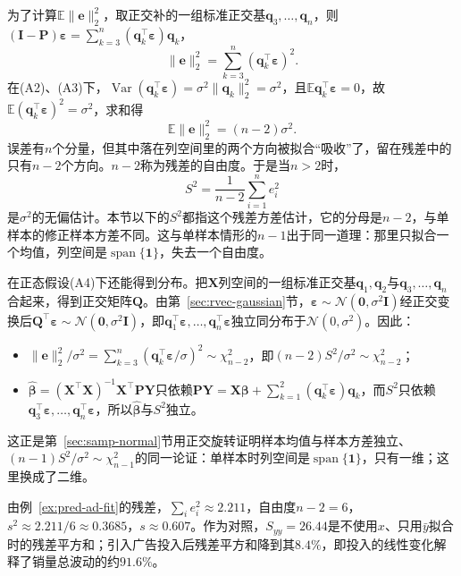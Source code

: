 为了计算$\mathbb E\lVert\bm e\rVert_2^2$，取正交补的一组标准正交基$\bm q_3,\dots,\bm q_n$，则$(\bm I-\bm P)\bm\varepsilon=\sum_{k=3}^n(\bm q_k^\top\bm\varepsilon)\bm q_k$，
\[
 \lVert\bm e\rVert_2^2=\sum_{k=3}^n(\bm q_k^\top\bm\varepsilon)^2.
\]
在(A2)、(A3)下，$\operatorname{Var}(\bm q_k^\top\bm\varepsilon)=\sigma^2\lVert\bm q_k\rVert_2^2=\sigma^2$，且$\mathbb E\bm q_k^\top\bm\varepsilon=0$，故$\mathbb E(\bm q_k^\top\bm\varepsilon)^2=\sigma^2$，求和得
\[
 \mathbb E\lVert\bm e\rVert_2^2=(n-2)\sigma^2.
\]
误差有$n$个分量，但其中落在列空间里的两个方向被拟合“吸收”了，留在残差中的只有$n-2$个方向。$n-2$称为残差的自由度。于是当$n>2$时，
\begin{equation}
 S^2=\frac{1}{n-2}\sum_{i=1}^ne_i^2
 \label{eq:pred-residual-variance}
\end{equation}
是$\sigma^2$的无偏估计。本节以下的$S^2$都指这个残差方差估计，它的分母是$n-2$，与单样本的修正样本方差不同。这与单样本情形的$n-1$出于同一道理：那里只拟合一个均值，列空间是$\operatorname{span}\{\bm 1\}$，失去一个自由度。

在正态假设(A4)下还能得到分布。把$\bm X$列空间的一组标准正交基$\bm q_1,\bm q_2$与$\bm q_3,\dots,\bm q_n$合起来，得到正交矩阵$\bm Q$。由第~\ref{sec:rvec-gaussian}节，$\bm\varepsilon\sim\mathcal N(\bm 0,\sigma^2\bm I)$经正交变换后$\bm Q^\top\bm\varepsilon\sim\mathcal N(\bm 0,\sigma^2\bm I)$，即$\bm q_1^\top\bm\varepsilon,\dots,\bm q_n^\top\bm\varepsilon$独立同分布于$\mathcal N(0,\sigma^2)$。因此：
\begin{itemize}
  \item $\lVert\bm e\rVert_2^2/\sigma^2=\sum_{k=3}^n(\bm q_k^\top\bm\varepsilon/\sigma)^2\sim\chi^2_{n-2}$，即$(n-2)S^2/\sigma^2\sim\chi^2_{n-2}$；
  \item $\hat{\bm\beta}=(\bm X^\top\bm X)^{-1}\bm X^\top\bm P\bm Y$只依赖$\bm P\bm Y=\bm X\bm\beta+\sum_{k=1}^2(\bm q_k^\top\bm\varepsilon)\bm q_k$，而$S^2$只依赖$\bm q_3^\top\bm\varepsilon,\dots,\bm q_n^\top\bm\varepsilon$，所以$\hat{\bm\beta}$与$S^2$独立。
\end{itemize}
这正是第~\ref{sec:samp-normal}节用正交旋转证明样本均值与样本方差独立、$(n-1)S^2/\sigma^2\sim\chi^2_{n-1}$的同一论证：单样本时列空间是$\operatorname{span}\{\bm 1\}$，只有一维；这里换成了二维。

\begin{example}[广告数据的残差方差]
\label{ex:pred-ad-residual-variance}
由例~\ref{ex:pred-ad-fit}的残差，$\sum_ie_i^2\approx2.211$，自由度$n-2=6$，$s^2\approx2.211/6\approx0.3685$，$s\approx0.607$。作为对照，$S_{yy}=26.44$是不使用$x$、只用$\bar y$拟合时的残差平方和；引入广告投入后残差平方和降到其$8.4\%$，即投入的线性变化解释了销量总波动的约$91.6\%$。
\end{example}

